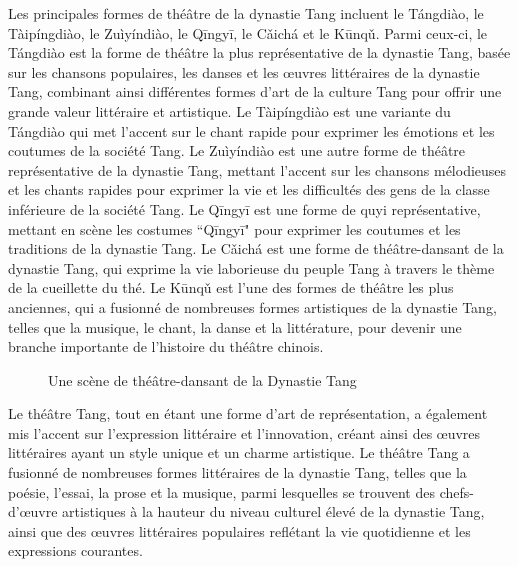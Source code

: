 \documentclass[UTF8,a4paper,12pt]{ctexart}
\numberwithin{equation}{section}
\begin{document}
Les principales formes de théâtre de la dynastie Tang incluent le Tángdiào, le Tàipíngdiào, le Zuìyíndiào, le Qīngyī, le Cǎichá et le Kūnqǔ. Parmi ceux-ci, le Tángdiào est la forme de théâtre la plus représentative de la dynastie Tang, basée sur les chansons populaires, les danses et les œuvres littéraires de la dynastie Tang, combinant ainsi différentes formes d'art de la culture Tang pour offrir une grande valeur littéraire et artistique. Le Tàipíngdiào est une variante du Tángdiào qui met l'accent sur le chant rapide pour exprimer les émotions et les coutumes de la société Tang. Le Zuìyíndiào est une autre forme de théâtre représentative de la dynastie Tang, mettant l'accent sur les chansons mélodieuses et les chants rapides pour exprimer la vie et les difficultés des gens de la classe inférieure de la société Tang. Le Qīngyī est une forme de quyi représentative, mettant en scène les costumes ``Qīngyī" pour exprimer les coutumes et les traditions de la dynastie Tang. Le Cǎichá est une forme de théâtre-dansant de la dynastie Tang, qui exprime la vie laborieuse du peuple Tang à travers le thème de la cueillette du thé. Le Kūnqǔ est l'une des formes de théâtre les plus anciennes, qui a fusionné de nombreuses formes artistiques de la dynastie Tang, telles que la musique, le chant, la danse et la littérature, pour devenir une branche importante de l'histoire du théâtre chinois.
\begin{figure}[H] 
\caption{Une scène de théâtre-dansant de la Dynastie Tang}
\end{figure}
Le théâtre Tang, tout en étant une forme d'art de représentation, a également mis l'accent sur l'expression littéraire et l'innovation, créant ainsi des œuvres littéraires ayant un style unique et un charme artistique. Le théâtre Tang a fusionné de nombreuses formes littéraires de la dynastie Tang, telles que la poésie, l'essai, la prose et la musique, parmi lesquelles se trouvent des chefs-d'œuvre artistiques à la hauteur du niveau culturel élevé de la dynastie Tang, ainsi que des œuvres littéraires populaires reflétant la vie quotidienne et les expressions courantes.
\end{document}
